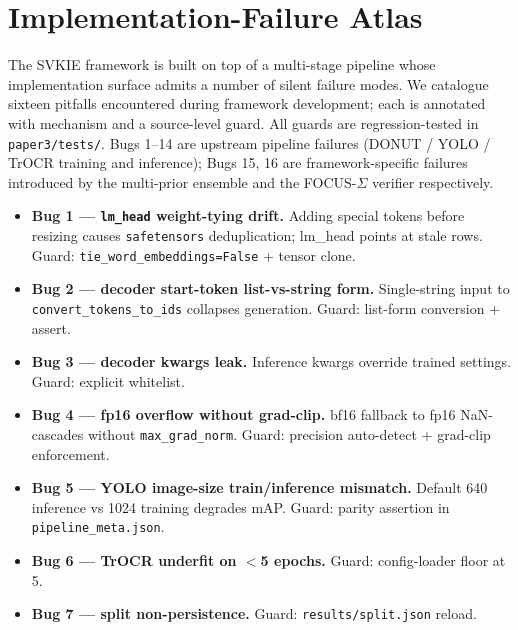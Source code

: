 \section{Implementation-Failure Atlas}
\label{sec:bugs}

The SVKIE framework is built on top of a multi-stage pipeline whose
implementation surface admits a number of silent failure modes.  We
catalogue sixteen pitfalls encountered during framework development;
each is annotated with mechanism and a source-level guard.  All
guards are regression-tested in \texttt{paper3/tests/}.  Bugs 1--14
are upstream pipeline failures (DONUT / YOLO / TrOCR training and
inference); Bugs 15, 16 are framework-specific failures introduced
by the multi-prior ensemble and the FOCUS-$\Sigma$ verifier
respectively.

\begin{itemize}
\item \textbf{Bug 1 --- \texttt{lm\_head} weight-tying drift.}  Adding
      special tokens before resizing causes \texttt{safetensors}
      deduplication; lm\_head points at stale rows.  Guard:
      \texttt{tie\_word\_embeddings=False} + tensor clone.

\item \textbf{Bug 2 --- decoder start-token list-vs-string form.}
      Single-string input to \texttt{convert\_tokens\_to\_ids}
      collapses generation.  Guard: list-form conversion + assert.

\item \textbf{Bug 3 --- decoder kwargs leak.}  Inference kwargs
      override trained settings.  Guard: explicit whitelist.

\item \textbf{Bug 4 --- fp16 overflow without grad-clip.}  bf16
      fallback to fp16 NaN-cascades without
      \texttt{max\_grad\_norm}.  Guard: precision auto-detect +
      grad-clip enforcement.

\item \textbf{Bug 5 --- YOLO image-size train/inference mismatch.}
      Default 640 inference vs 1024 training degrades mAP.  Guard:
      parity assertion in \texttt{pipeline\_meta.json}.

\item \textbf{Bug 6 --- TrOCR underfit on $<$5 epochs.}  Guard:
      config-loader floor at 5.

\item \textbf{Bug 7 --- split non-persistence.}  Guard:
      \texttt{results/split.json} reload.


\end{itemize}
